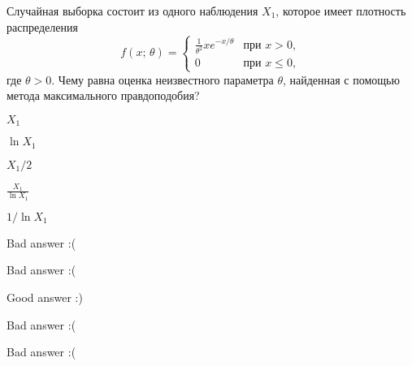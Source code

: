 
\begin{question}
Случайная выборка состоит из одного наблюдения \(X_1\), которое имеет
плотность распределения \[
f(x; \, \theta) = \begin{cases}
    \tfrac{1}{\theta^2} x e^{-x/\theta} & \text{при } x > 0,  \\
    0 & \text{при }x\leq 0,
  \end{cases}
\] где \(\theta > 0\). Чему равна оценка неизвестного параметра
\(\theta\), найденная с помощью метода максимального правдоподобия?
\begin{answerlist}
  \item \(X_1\)
  \item \(\ln X_1\)
  \item \(X_1 / 2\)
  \item \(\frac{X_1}{\ln X_1}\)
  \item \(1 / \ln X_1\)
\end{answerlist}
\end{question}

\begin{solution}
\begin{answerlist}
  \item Bad answer :(
  \item Bad answer :(
  \item Good answer :)
  \item Bad answer :(
  \item Bad answer :(
\end{answerlist}
\end{solution}

